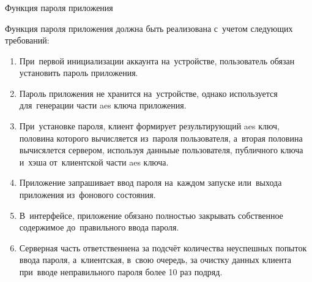 \subsubsection{} Функция пароля приложения
\label{sec:analysis:research:funcreq:pin}

Функция пароля приложения должна быть реализована с~учетом следующих требований:
\begin{enumerate}
	\item При~первой инициализации аккаунта на~устройстве, пользователь обязан установить пароль приложения.
	\item Пароль приложения не хранится на~устройстве, однако используется для~генерации части \gls{aes} ключа приложения.
	\item При~установке пароля, клиент формирует результирующий \gls{aes} ключ, половина которого вычисляется из~пароля пользователя, а~вторая половина вычисялется сервером, используя данныые пользователя, публичного ключа и~хэша от~клиентской части \gls{aes} ключа.
	\item Приложение запрашивает ввод пароля на~каждом запуске или~выхода приложения из~фонового состояния.
	\item В~интерфейсе, приложение обязано полностью закрывать собственное содержимое до~правильного ввода пароля.
	\item Серверная часть ответственнена за подсчёт количества неуспешных попыток ввода пароля, а~клиентская, в~свою очередь, за очистку данных клиента при~вводе неправильного пароля более 10 раз подряд.
\end{enumerate}